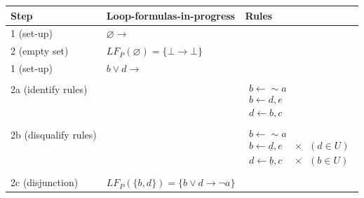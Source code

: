 \documentclass[9pt,a4paper,landscape]{article}
\begin{document}
{\begin{center}
	\begin{tabular}{p{3cm}p{5cm}p{6cm}}
		Step & Loop-formulas-in-progress & Rules \\ \midrule
		1 (set-up) & $\varnothing \rightarrow$ & \\
		2 (empty set) & $LF_P(\varnothing) = \{ \bot \rightarrow \bot \}$ & \\ \midrule
		
		1 (set-up) & $b \lor d \rightarrow$ & \\ & \\
		2a (identify rules) &  & $\begin{array}{l}
		b \leftarrow {\sim} a\\
		b \leftarrow d, e\\
		d \leftarrow b, c
		\end{array}$  \\ & \\
		2b (disqualify rules) &  & $\begin{array}{ll}
		b \leftarrow {\sim} a &  \\
		b \leftarrow \underline{d}, e & \times \hspace{8pt} (d \in U) \\
		d \leftarrow \underline{b}, c & \times \hspace{8pt} (b \in U) 
		\end{array}$  \\ & \\
		2c (disjunction) & $LF_P( \{b, d\} ) = \{b \lor d \rightarrow \neg a\}$ \\ \midrule

\end{tabular}
\end{center}}
\end{document}
